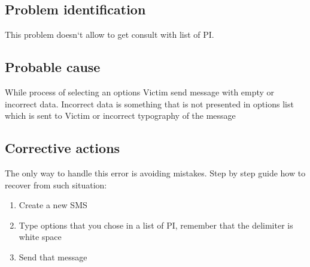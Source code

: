 \subsection{Problem identification}
This problem doesn`t allow to get consult with list of PI. 

\subsection{Probable cause}
While process of selecting an options Victim send message with empty or incorrect data. Incorrect data is something that is not presented in options list which is sent to Victim or incorrect typography of the message

\subsection{Corrective actions}
The only way to handle this error is avoiding mistakes. Step by step guide how to recover from such situation:
\begin{enumerate}
  \item Create a new SMS
  \item Type options that you chose in a list of PI, remember that the delimiter
  is white space
  \item Send that message
\end{enumerate}


